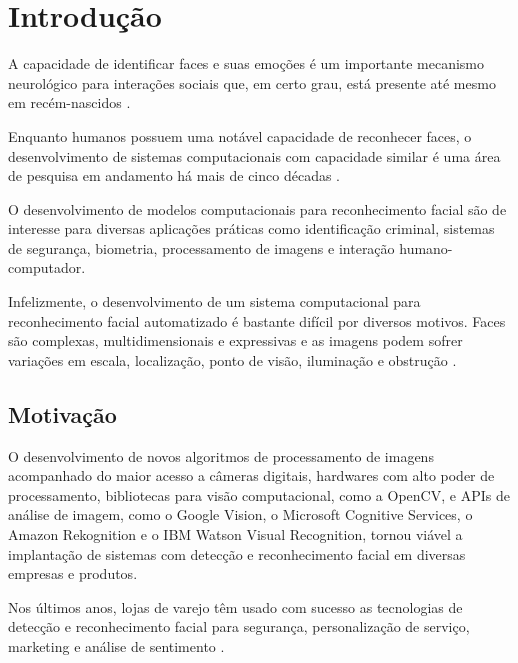 \chapter*{Introdução}

A capacidade de identificar faces e suas emoções é um importante mecanismo neurológico para interações sociais que, em certo grau, está presente até mesmo em recém-nascidos \cite{morton1991conspec, fantz1961origin}.

Enquanto humanos possuem uma notável capacidade de reconhecer faces, o desenvolvimento de sistemas computacionais com capacidade similar é uma área de pesquisa em andamento há mais de cinco décadas \cite{bledsoe1964facial, chan1965man, bledsoe1966man, bledsoe1966model, boyer1991biographical, kelly1970visual, kanade1973picture}.

O desenvolvimento de modelos computacionais para reconhecimento facial são de interesse para diversas aplicações práticas como identificação criminal, sistemas de segurança, biometria, processamento de imagens e interação humano-computador.

Infelizmente, o desenvolvimento de um sistema computacional para reconhecimento facial automatizado é bastante difícil por diversos motivos. Faces são complexas, multidimensionais e expressivas \cite{turk1991eigenfaces} e as imagens podem sofrer variações em escala, localização, ponto de visão, iluminação e obstrução \cite{censtudy}.

\section*{Motivação}\label{sec:motivacao}

O desenvolvimento de novos algoritmos de processamento de imagens acompanhado do maior acesso a câmeras digitais, hardwares com alto poder de processamento, bibliotecas para visão computacional, como a OpenCV, e APIs de análise de imagem, como o Google Vision, o Microsoft Cognitive Services, o Amazon Rekognition e o IBM Watson Visual Recognition, tornou viável a implantação de sistemas com detecção e reconhecimento facial em diversas empresas e produtos.

Nos últimos anos, lojas de varejo têm usado com sucesso as tecnologias de detecção e reconhecimento facial para segurança, personalização de serviço, marketing e análise de sentimento \cite{fortune2015walmart, consumer2015facial, exame2018pontofrio, 2017recfacial, 2015bbcfacewatch}.

